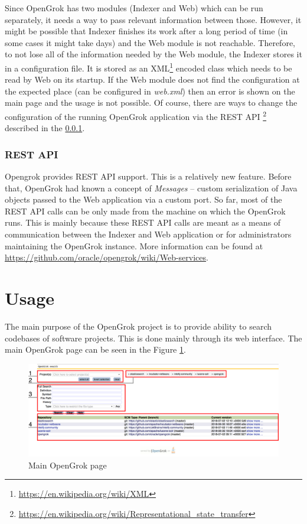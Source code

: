 Since OpenGrok has two modules (Indexer and Web) which can be run separately, it needs a way to pass relevant
information between those. However, it might be possible that Indexer finishes its work after a long period of time
(in some cases it might take days) and the Web module is not reachable. Therefore, to not lose all of the information
needed by the Web module, the Indexer stores it in a configuration file. It is stored as an
XML\footnote{\url{https://en.wikipedia.org/wiki/XML}} encoded class which needs to be read by Web on its startup.
If the Web module does not find the configuration at the expected place (can be configured in \textit{web.xml}) then an
error is shown on the main page and the usage is not possible. Of course, there are ways to change the configuration
of the running OpenGrok application via the REST API \footnote{\url{https://en.wikipedia.org/wiki/Representational\_state\_transfer}}
described in the \ref{opengrok_rest}.

\subsubsection{REST API}
\label{opengrok_rest}

Opengrok provides REST API support. This is a relatively new feature. Before that, OpenGrok had known a concept of
\textit{Messages} – custom serialization of Java objects passed to the Web application via a custom port.
So far, most of the REST API calls can be only made from the machine on which the OpenGrok runs.
This is mainly because these REST API calls are meant as a means of communication between the Indexer and Web application
or for administrators maintaining the OpenGrok instance. More information can be found at
\url{https://github.com/oracle/opengrok/wiki/Web-services}.

\section{Usage}
\label{opengrok_usage}
The main purpose of the OpenGrok project is to provide ability to search codebases of software projects. This is done
mainly through its web interface. The main OpenGrok page can be seen in the Figure \ref{opengrok_main}.

\begin{figure}[htbp]
    \centering
    \includegraphics[width=145mm]{../img/opengrok_main.png}
    \caption{Main OpenGrok page}
    \label{opengrok_main}
\end{figure}

